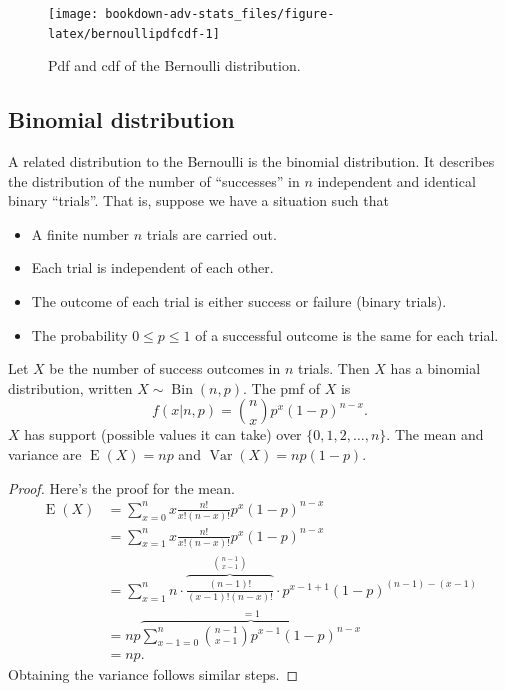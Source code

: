 \documentclass[
]{book}
\providecommand{\tightlist}{%
  \setlength{\itemsep}{0pt}\setlength{\parskip}{0pt}}
\DeclareMathOperator{\E}{E}
\DeclareMathOperator{\Var}{Var}
\DeclareMathOperator{\Bin}{Bin}
\theoremstyle{definition}
\theoremstyle{definition}
\theoremstyle{definition}
\theoremstyle{definition}
\theoremstyle{remark}
\begin{document}
\begin{figure}

{\centering \texttt{[image: bookdown-adv-stats\_files/figure-latex/bernoullipdfcdf-1]} 

}

\caption{Pdf and cdf of the Bernoulli distribution.}\label{fig:bernoullipdfcdf}
\end{figure}

\hypertarget{binomial-distribution}{%
\subsection{Binomial distribution}\label{binomial-distribution}}

A related distribution to the Bernoulli is the binomial distribution.
It describes the distribution of the number of ``successes'' in \(n\) independent and identical binary ``trials''.
That is, suppose we have a situation such that

\begin{itemize}
\tightlist
\item
  A finite number \(n\) trials are carried out.
\item
  Each trial is independent of each other.
\item
  The outcome of each trial is either success or failure (binary trials).
\item
  The probability \(0 \leq p\leq 1\) of a successful outcome is the same for each trial.
\end{itemize}

Let \(X\) be the number of success outcomes in \(n\) trials. Then \(X\) has a binomial distribution, written \(X\sim\Bin(n,p)\).
The pmf of \(X\) is
\[
f(x|n,p) = {n \choose x}p^x (1-p)^{n-x}.
\]
\(X\) has support (possible values it can take) over \(\{0,1,2,\dots,n\}\).
The mean and variance are \(\E(X)=np\) and \(\Var(X)=np(1-p)\).

\begin{proof}
Here's the proof for the mean.
\begin{align*}
\E(X) 
&= \sum_{x=0}^n x \frac{n!}{x!(n-x)!} p^x (1-p)^{n-x} \\
&= \sum_{x=1}^n x \frac{n!}{x!(n-x)!} p^x (1-p)^{n-x} \\
&=\sum_{x=1}^n n \cdot \overbrace{\frac{(n-1)!}{(x-1)!(n-x)!}}^{{n-1 \choose x-1}} \cdot p^{x-1+1} (1-p)^{(n-1)-(x-1)} \\
&= np \overbrace{\sum_{x-1=0}^n  {n-1 \choose x-1} p^{x-1} (1-p)^{n-x}}^{=1} \\
&= np. 
\end{align*}
Obtaining the variance follows similar steps.
\end{proof}
\end{document}
